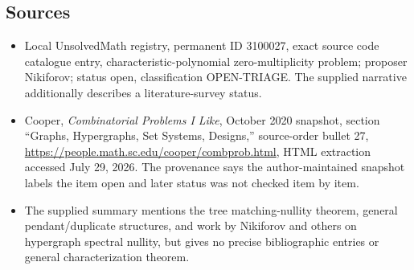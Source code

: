 \documentclass[11pt]{article}
\begin{document}
\subsection{Sources}
\begin{itemize}
\item Local UnsolvedMath registry, permanent ID 3100027, exact source code catalogue entry, characteristic-polynomial zero-multiplicity problem; proposer Nikiforov; status open, classification OPEN-TRIAGE. The supplied narrative additionally describes a literature-survey status.
\item Cooper, \emph{Combinatorial Problems I Like}, October 2020 snapshot, section ``Graphs, Hypergraphs, Set Systems, Designs,'' source-order bullet 27, \url{https://people.math.sc.edu/cooper/combprob.html}, HTML extraction accessed July 29, 2026. The provenance says the author-maintained snapshot labels the item open and later status was not checked item by item.
\item The supplied summary mentions the tree matching-nullity theorem, general pendant/duplicate structures, and work by Nikiforov and others on hypergraph spectral nullity, but gives no precise bibliographic entries or general characterization theorem.
\end{itemize}
\end{document}
